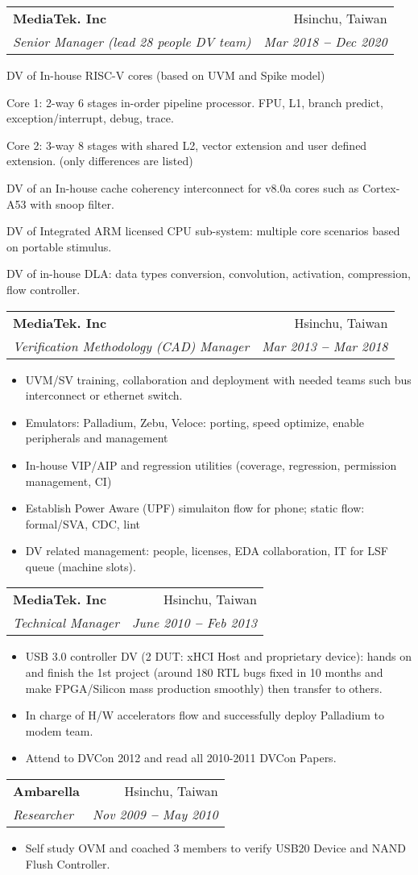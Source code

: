 \documentclass[letterpaper,11pt]{article}
\makeatletter
\newcommand{\resumeItem}[1]{
  \item\small{
    {#1 \vspace{-2pt}}
  }
}
\newcommand{\resumeSubheading}[4]{
  \vspace{-2pt}\item
    \begin{tabular*}{0.97\textwidth}[t]{l@{\extracolsep{\fill}}r}
      \textbf{#1} & #2 \\
      \textit{\small#3} & \textit{\small #4} \\
    \end{tabular*}\vspace{-7pt}
}
\newcommand{\resumeSubHeadingListStart}{\begin{itemize}[leftmargin=0.15in, label={}]}
\newcommand{\resumeSubHeadingListEnd}{\end{itemize}}
\newcommand{\resumeItemListStart}{\begin{itemize}}
\newcommand{\resumeItemListEnd}{\end{itemize}\vspace{-5pt}}
\makeatother
\begin{document}
    \resumeSubheading
      {MediaTek. Inc}{Hsinchu, Taiwan}
      {Senior Manager (lead 28 people DV team)}{Mar 2018 \textbf{--} Dec 2020}
        \resumeItemListStart
	    \resumeItem{DV of In-house RISC-V cores (based on UVM and Spike model)}
                \resumeSubHeadingListStart
	\small{\item{ Core 1: 2-way 6 stages in-order pipeline processor. FPU, L1, branch predict, exception/interrupt, debug, trace.}}
	\small{\item{ Core 2: 3-way 8 stages with shared L2, vector extension and user defined extension. (only differences are listed)}}
                \resumeSubHeadingListEnd
    
	    \resumeItem{DV of an In-house cache coherency interconnect for v8.0a cores such as Cortex-A53 with snoop filter.}
	    \resumeItem{DV of Integrated ARM licensed CPU sub-system: multiple core scenarios based on portable stimulus.}
	    \resumeItem{DV of in-house DLA: data types conversion, convolution, activation, compression, flow controller.}
        \resumeItemListEnd

    \resumeSubheading
      {MediaTek. Inc}{Hsinchu, Taiwan}
      {Verification Methodology (CAD) Manager}{Mar 2013 \textbf{--} Mar 2018}
        \resumeItemListStart
	    \resumeItem{UVM/SV training, collaboration and deployment with needed teams such bus interconnect or ethernet switch.}
	    \resumeItem{Emulators: Palladium, Zebu, Veloce: porting, speed optimize, enable peripherals and management}
	    \resumeItem{In-house VIP/AIP and regression utilities (coverage, regression, permission management, CI)}
	    \resumeItem{Establish Power Aware (UPF) simulaiton flow for phone; static flow: formal/SVA, CDC, lint}
	    \resumeItem{DV related management: people, licenses, EDA collaboration, IT for LSF queue (machine slots).}
        \resumeItemListEnd

     \resumeSubheading
      {MediaTek. Inc}{Hsinchu, Taiwan}
      {Technical Manager}{June 2010 \textbf{--} Feb 2013}
        \resumeItemListStart
	    \resumeItem{USB 3.0 controller DV (2 DUT: xHCI Host and proprietary device): hands on and finish the 1st project (around 180 RTL bugs fixed in 10 months and make FPGA/Silicon mass production smoothly) then transfer to others.}
	    \resumeItem{In charge of H/W accelerators flow and successfully deploy Palladium to modem team.}
	    \resumeItem{Attend to DVCon 2012 and read all 2010-2011 DVCon Papers.}
        \resumeItemListEnd

      \resumeSubheading
      {Ambarella}{Hsinchu, Taiwan}
      {Researcher}{Nov 2009 \textbf{--} May 2010}
        \resumeItemListStart
	    \resumeItem{Self study OVM and coached 3 members to verify USB20 Device and NAND Flush Controller.}
        \resumeItemListEnd
   
\end{document}
